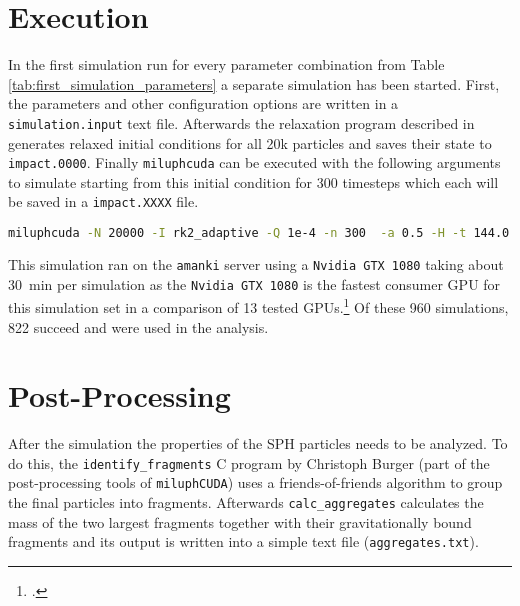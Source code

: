 \section{Execution}

In the first simulation run for every parameter combination from Table \ref{tab:first_simulation_parameters} a separate simulation has been started. First, the parameters and other configuration options are written in a \mbox{\texttt{simulation.input}} text file. Afterwards the relaxation program described in \cite[24\psqq]{Burger2018} generates relaxed initial conditions for all 20k particles and saves their state to \texttt{impact.0000}. Finally \texttt{miluphcuda} can be executed with the following arguments to simulate starting from this initial condition for 300 timesteps which each will be saved in a \texttt{impact.XXXX} file.

\begin{lstlisting}[language=bash,flexiblecolumns=false]
miluphcuda -N 20000 -I rk2_adaptive -Q 1e-4 -n 300  -a 0.5 -H -t 144.0 -f impact.0000 -m material.cfg -s -g
\end{lstlisting}

This simulation ran on the \texttt{amanki} server using a \texttt{Nvidia GTX 1080} taking about \SI{30}{\minute} per simulation as the \texttt{Nvidia GTX 1080} is the fastest consumer GPU for this simulation set in a comparison of 13 tested GPUs.\footcite{Dorninger} Of these 960 simulations, 822 succeed and were used in the analysis.


\section{Post-Processing}
\label{sec:postprocessing}

After the simulation the properties of the SPH particles needs to be analyzed. To do this, the \texttt{identify\_fragments} C program by Christoph Burger (part of the post-processing tools of \texttt{miluphCUDA}) uses a friends-of-friends algorithm to group the final particles into fragments. Afterwards \texttt{calc\_aggregates} calculates the mass of the two largest fragments together with their gravitationally bound fragments and its output is written into a simple text file (\texttt{aggregates.txt}).


